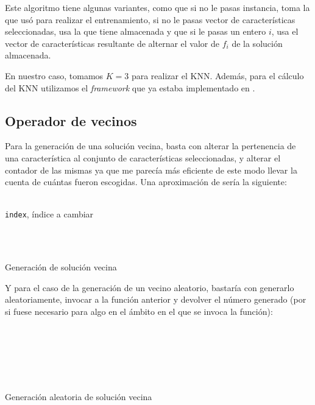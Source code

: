 		Este algoritmo tiene algunas variantes, como que si no le pasas instancia, toma la que
		usó para realizar el entrenamiento, si no le pasas vector de características seleccionadas,
		usa la que tiene almacenada y que si le pasas un entero $i$, usa el vector de características
		resultante de alternar el valor de $f_i$ de la solución almacenada.
		
		En nuestro caso, tomamos $K=3$ para realizar el KNN. Además, para el cálculo del KNN
		utilizamos el \textit{framework} que ya estaba implementado en \cite{KNN}.
	
	\subsection{Operador de vecinos}
		Para la generación de una solución vecina, basta con alterar la pertenencia de una
		característica al conjunto de características seleccionadas, y alterar el contador
		de las mismas ya que me parecía más eficiente de este modo llevar la cuenta de cuántas
		fueron escogidas. Una aproximación de sería la siguiente:
		
		\begin{algorithm}[H]
			\begin{algorithmic}[1]
				\REQUIRE \ \\
		        	\texttt{index}, índice a cambiar\\ \

		     	\\
				\ELSE
				\ENDIF
			\end{algorithmic}
		\caption{Generación de solución vecina}
		\label{Flip}
		\end{algorithm}
	
		Y para el caso de la generación de un vecino aleatorio, bastaría con generarlo aleatoriamente,
		invocar a la función anterior y devolver el número generado (por si fuese necesario
		para algo en el ámbito en el que se invoca la función):
	
		\begin{algorithm}[H]
			\begin{algorithmic}[1]
				\REQUIRE \ \\
					 \

		     	\\
		  		\\
		  		
			\end{algorithmic}
		\caption{Generación aleatoria de solución vecina}
		\label{Neighbour}
		\end{algorithm}
	
